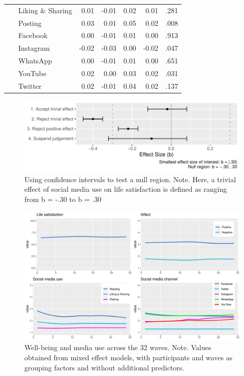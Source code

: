 \documentclass[
  man,mask]{apa7}
\begin{document}
\begin{table}[tbp]
\begin{center}
\begin{threeparttable}
{\begin{tabular}{lrrrrr}
\ \ \ Liking \& Sharing & 0.01 & -0.01 & 0.02 & 0.01 & .281\\
\ \ \ Posting & 0.03 & 0.01 & 0.05 & 0.02 & .008\\
\ \ \ Facebook & 0.00 & -0.01 & 0.01 & 0.00 & .913\\
\ \ \ Instagram & -0.02 & -0.03 & 0.00 & -0.02 & .047\\
\ \ \ WhatsApp & 0.00 & -0.01 & 0.01 & 0.00 & .651\\
\ \ \ YouTube & 0.02 & 0.00 & 0.03 & 0.02 & .031\\
\ \ \ Twitter & 0.02 & -0.01 & 0.04 & 0.02 & .137\\
\bottomrule
\end{tabular}

}

\end{threeparttable}
\end{center}

\end{table}

\newpage

\begin{figure}
\centering
\includegraphics{manuscript_files/figure-latex/sesoi-1.pdf}
\caption{\label{fig:sesoi}Using confidence intervals to test a null region. Note. Here, a trivial effect of social media use on life satisfaction is defined as ranging from b = -.30 to b = .30}
\end{figure}

\newpage

\begin{figure}
\includegraphics[width=\textwidth]{figures/fig_descriptives} \caption{Well-being and media use across the 32 waves. Note. Values obtained from mixed effect models, with participants and waves as grouping factors and without additional predictors.}\label{fig:fig-descriptives}
\end{figure}
\end{document}
